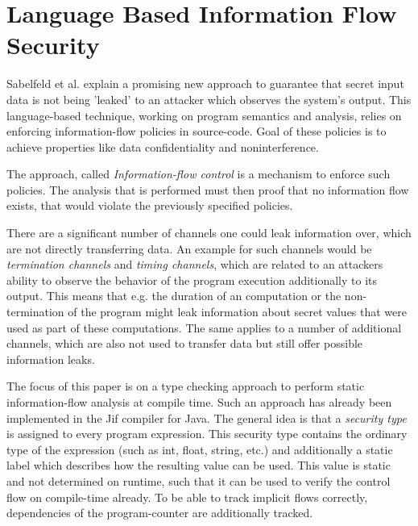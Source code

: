 \documentclass[a4paper,UKenglish]{lipics-v2018}
\begin{document}
\section{Language Based Information Flow Security}

Sabelfeld et al. explain a promising new approach to guarantee that secret input data is not being 'leaked' to an attacker which observes the system's output. This language-based technique, working on program semantics and analysis, relies on enforcing information-flow policies in source-code. Goal of these policies is to achieve properties like data confidentiality and noninterference.\cite{language_based_information_flow_security}

The approach, called \textit{Information-flow control} is a mechanism to enforce such policies. The analysis that is performed must then proof that no information flow exists, that would violate the previously specified policies.\cite{language_based_information_flow_security}

There are a significant number of channels one could leak information over, which are not directly transferring data. An example for such channels would be \textit{termination channels} and \textit{timing channels}, which are related to an attackers ability to observe the behavior of the program execution additionally to its output. This means that e.g. the duration of an computation or the non-termination of the program might leak information about secret values that were used as part of these computations.
The same applies to a number of additional channels, which are also not used to transfer data but still offer possible information leaks.\cite{language_based_information_flow_security} %

The focus of this paper is on a type checking approach to perform static information-flow analysis at compile time. Such an approach has already been implemented in the Jif compiler for Java.\cite{JFlow} The general idea is that a \textit{security type} is assigned to every program expression. This security type contains the ordinary type of the expression (such as int, float, string, etc.) and additionally a static label which describes how the resulting value can be used. This value is static and not determined on runtime, such that it can be used to verify the control flow on compile-time already.\cite{language_based_information_flow_security}
To be able to track implicit flows correctly, dependencies of the program-counter are additionally tracked.
\end{document}
